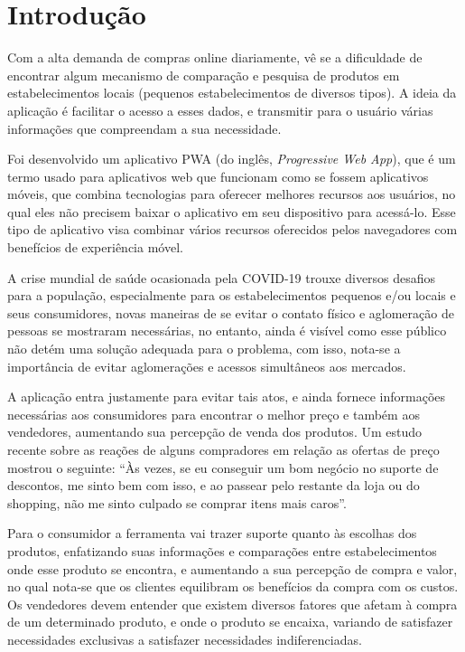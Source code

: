 \section{Introdução}
\label{sec:introducao}

Com a alta demanda de compras online diariamente, vê se a dificuldade de encontrar algum mecanismo de comparação e pesquisa de produtos em estabelecimentos locais (pequenos estabelecimentos de diversos tipos). A ideia da aplicação é facilitar o acesso a esses dados, e transmitir para o usuário várias informações que compreendam a sua necessidade.

Foi desenvolvido um aplicativo PWA (do inglês, \textit{Progressive Web App}), que é um termo usado para aplicativos web que funcionam como se fossem aplicativos móveis, que combina tecnologias para oferecer melhores recursos aos usuários, no qual eles não precisem baixar o aplicativo em seu dispositivo para acessá-lo. Esse tipo de aplicativo visa combinar vários recursos oferecidos pelos navegadores com benefícios de experiência móvel. {\cite{souza2017pwa}}

A crise mundial de saúde ocasionada pela COVID-19 trouxe diversos desafios para a população, especialmente para os estabelecimentos pequenos e/ou locais e seus consumidores, novas maneiras de se evitar o contato físico e aglomeração de pessoas se mostraram necessárias, no entanto, ainda é visível como esse público não detém uma solução adequada para o problema, com isso, nota-se a importância de evitar aglomerações e acessos simultâneos aos mercados.

A aplicação entra justamente para evitar tais atos, e ainda fornece informações necessárias aos consumidores para encontrar o melhor preço e também aos vendedores, aumentando sua percepção de venda dos produtos. Um estudo recente sobre as reações de alguns compradores em relação as ofertas de preço mostrou o seguinte: ``Às vezes, se eu conseguir um bom negócio no suporte de descontos, me sinto bem com isso, e  ao passear pelo restante da loja ou do shopping, não me sinto culpado se comprar itens mais caros''.{\cite{grewal1998effects}} 

Para o consumidor a ferramenta vai trazer suporte quanto às escolhas dos produtos, enfatizando suas informações e comparações entre estabelecimentos onde esse produto se encontra, e aumentando a sua percepção de compra e valor, no qual nota-se que os clientes equilibram os benefícios da compra com os custos{\cite{grewal1998effects}}. Os vendedores devem entender que existem diversos fatores que afetam à compra de um determinado produto, e onde o produto se encaixa, variando de satisfazer necessidades exclusivas a satisfazer necessidades indiferenciadas.{\cite{grewal1998effects}}



